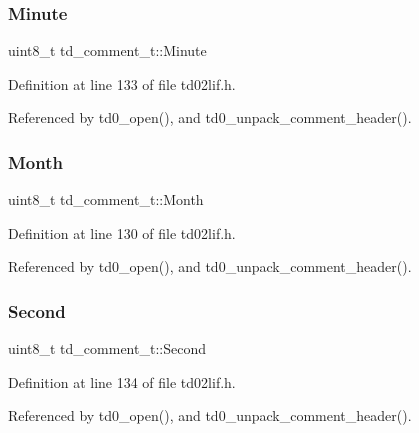 \subsubsection{\texorpdfstring{Minute}{Minute}}
{\footnotesize\ttfamily uint8\+\_\+t td\+\_\+comment\+\_\+t\+::\+Minute}



Definition at line 133 of file td02lif.\+h.



Referenced by td0\+\_\+open(), and td0\+\_\+unpack\+\_\+comment\+\_\+header().

\mbox{\label{structtd__comment__t_ac926fbfad0e3544bb45bb05b7cd66c49}} 
\subsubsection{\texorpdfstring{Month}{Month}}
{\footnotesize\ttfamily uint8\+\_\+t td\+\_\+comment\+\_\+t\+::\+Month}



Definition at line 130 of file td02lif.\+h.



Referenced by td0\+\_\+open(), and td0\+\_\+unpack\+\_\+comment\+\_\+header().

\mbox{\label{structtd__comment__t_ae89673be13e6cad1c83bd51034689248}} 
\subsubsection{\texorpdfstring{Second}{Second}}
{\footnotesize\ttfamily uint8\+\_\+t td\+\_\+comment\+\_\+t\+::\+Second}



Definition at line 134 of file td02lif.\+h.



Referenced by td0\+\_\+open(), and td0\+\_\+unpack\+\_\+comment\+\_\+header().

\mbox{\label{structtd__comment__t_aca61f38ae62a6de2ff0eab7da2c25e11}} 
